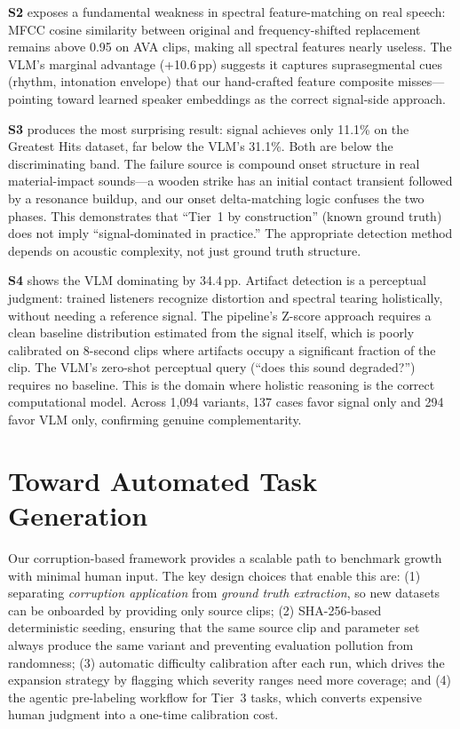 \documentclass[11pt]{article}
\begin{document}
\textbf{S2} exposes a fundamental weakness in spectral feature-matching on real speech: MFCC
cosine similarity between original and frequency-shifted replacement remains above 0.95 on
AVA clips, making all spectral features nearly useless. The VLM's marginal advantage (+10.6\,pp)
suggests it captures suprasegmental cues (rhythm, intonation envelope) that our hand-crafted
feature composite misses---pointing toward learned speaker embeddings as the correct
signal-side approach.

\textbf{S3} produces the most surprising result: signal achieves only 11.1\% on the Greatest
Hits dataset, far below the VLM's 31.1\%. Both are below the discriminating band. The failure
source is compound onset structure in real material-impact sounds---a wooden strike has an
initial contact transient followed by a resonance buildup, and our onset delta-matching logic
confuses the two phases. This demonstrates that ``Tier~1 by construction'' (known ground truth)
does not imply ``signal-dominated in practice.'' The appropriate detection method depends on
acoustic complexity, not just ground truth structure.

\textbf{S4} shows the VLM dominating by 34.4\,pp. Artifact detection is a perceptual judgment:
trained listeners recognize distortion and spectral tearing holistically, without needing a
reference signal. The pipeline's Z-score approach requires a clean baseline distribution estimated
from the signal itself, which is poorly calibrated on 8-second clips where artifacts occupy
a significant fraction of the clip. The VLM's zero-shot perceptual query (``does this sound
degraded?'') requires no baseline. This is the domain where holistic reasoning is the correct
computational model. Across 1,094 variants, 137 cases favor signal only and 294 favor VLM only,
confirming genuine complementarity.

\section{Toward Automated Task Generation}

Our corruption-based framework provides a scalable path to benchmark growth with minimal human
input. The key design choices that enable this are: (1) separating \emph{corruption application}
from \emph{ground truth extraction}, so new datasets can be onboarded by providing only source
clips; (2) SHA-256-based deterministic seeding, ensuring that the same source clip and parameter
set always produce the same variant and preventing evaluation pollution from randomness; (3)
automatic difficulty calibration after each run, which drives the expansion strategy by flagging
which severity ranges need more coverage; and (4) the agentic pre-labeling workflow for Tier~3
tasks, which converts expensive human judgment into a one-time calibration cost.
\end{document}
